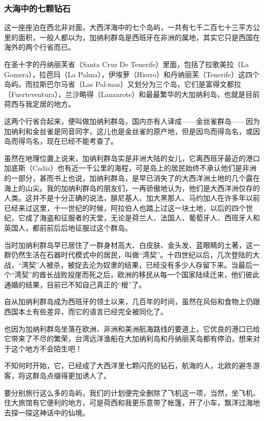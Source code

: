 \subsubsection*{大海中的七颗钻石}
\par 这一座座泊在西北非对面，大西洋海中的七个岛屿，一共有七千二百七十三平方公里的面积，一般人都以为，加纳利群岛是西班牙在非洲的属地，其实它只是西国在海外的两个行省而已。
\par 在圣十字的丹纳丽芙省（Santa Cruz De Tenerife）里面，包括了拉歌美拉（La Gomera），拉芭玛（La Palma），伊埃萝（Hierro）和丹纳丽芙（Tenerife）这四个岛屿。而拉斯巴尔马省（Las Pal-mas）又划分为三个岛，它们是富得文都拉（Fuerteventura），兰沙略得（Lanzarote）和最最繁华的大加纳利岛，也就是目前荷西与我定居的地方。
\par 这两个行省合起来，便叫做加纳利群岛，国内亦有人译成——金丝雀群岛——因为加纳利和金丝雀是同音同字，这儿也是金丝雀的原产地，但是因鸟而得岛名，或因岛而得鸟名，现在已经不能考查了。
\par 虽然在地理位置上说来，加纳利群岛实是非洲大陆的女儿，它离西班牙最近的港口加底斯（Cadiz）也有近一千公里的海程，可是岛上的居民始终不承认他们是非洲的一部分，甚而书上也说，加纳利群岛，是早已消失了的大西洋洲土地的几个露在海上的山尖。我的加纳利群岛的朋友们，一再骄傲地认为，他们是大西洋洲仅存的人类。这并不是十分正确的说法，腓尼基人、加大黑那人、马约加人在许多年以前已经来过这里，十一世纪的时候，阿拉伯人也踏上过这一块土地，以后的四个世纪，它成了海盗和征服者的天堂，无论是荷兰人、法国人、葡萄牙人、西班牙人和英国人，都前前后后地征服过这个群岛。
\par 当时加纳利群岛早已居住了一群身材高大、白皮肤、金头发、蓝眼睛的土著，这一群仍然生活在石器时代模式中的居民，叫做“湾契”。十四世纪以后，几次登陆的大战，“湾契”人被杀，被捉去沦为奴隶的结果，已经没有多少人存留下来。当最后一个“湾契”的酋长战败投崖而死之后，欧洲的移民从每一个国家陆续迁来，他们彼此通婚的结果，目前已不知自己真正的“根”了。
\par 自从加纳利群岛成为西班牙的领土以来，几百年的时间，虽然在风俗和食物上仍跟西国本土有些差异，而它的语言已经完全被同化了。
\par 也因为加纳利群岛坐落在欧洲、非洲和美洲航海路线的要道上，它优良的港口已给它带来了不尽的繁荣，台湾远洋渔船在大加纳利岛和丹纳丽芙岛都有停泊，想来对于这个地方不会陌生吧！
\par 不知何时开始，它，已经成了大西洋里七颗闪亮的钻石，航海的人，北欧的避冬游客，将这群岛点缀得更加诱人了。
\par 要分别旅行这么多的岛屿，我们的计划便完全删除了飞机这一项，当然，坐飞机、住大旅馆有它便利的地方，可是荷西和我更乐意带了帐篷，开了小车，飘洋过海地去探一探这神话中的仙境。
